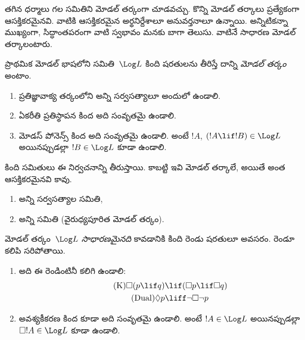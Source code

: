 \documentclass[../../../include/open-logic-section]{subfiles}
\begin{document}


తగిన ధర్మాలు గల  సమితిని మోడల్ తర్కంగా చూడవచ్చు. కొన్ని మోడల్ తర్కాలు ప్రత్యేకంగా ఆసక్తికరమైనవి. వాటికి ఆసక్తికరమైన అర్థనిర్దేశాలూ అనువర్తనాలూ ఉన్నాయి. అన్నిటికన్నా ముఖ్యంగా, సిద్ధాంతపరంగా వాటి స్వభావం మనకు బాగా తెలుసు. వాటినే సాధారణ మోడల్ తర్కాలంటారు.

\begin{defn}
ప్రాథమిక మోడల్ భాషలోని  సమితి~$\Log L$ కింది షరతులను తీరిస్తే దాన్ని \emph{మోడల్ తర్కం} అంటాం.
\begin{enumerate}
\item ప్రతిజ్ఞావాక్య తర్కంలోని అన్ని సర్వసత్యాలూ అందులో ఉండాలి.
\item ఏకరీతి ప్రతిస్థాపన కింద అది సంవృతమై ఉండాలి.
\item మోడస్ పోనెన్స్ కింద అది సంవృతమై ఉండాలి. అంటే $!A$, $(!A \lif
  !B) \in \Log L$ అయినప్పుడల్లా $!B \in \Log L$ కూడా ఉండాలి.
\end{enumerate}
\end{defn}

\begin{ex}
కింది  సమితులు ఈ నిర్వచనాన్ని తీరుస్తాయి. కాబట్టి ఇవి మోడల్ తర్కాలే, అయితే అంత ఆసక్తికరమైనవి కావు.
\begin{enumerate}
\item అన్ని సర్వసత్యాల సమితి,
\item అన్ని  సమితి (వైరుధ్యపూరిత మోడల్ తర్కం).
\end{enumerate}
\end{ex}

\begin{defn}\label{defn:normal-modal-logic}
మోడల్ తర్కం~$\Log L$ \emph{సాధారణమైనది} కావడానికి కింది రెండు షరతులూ అవసరం. రెండూ కలిపి సరిపోతాయి.
\begin{enumerate}
\item అది ఈ రెండింటినీ కలిగి ఉండాలి:
\begin{align}
\tag{K} \Box(p \lif q) & \lif (\Box p \lif \Box q) \\
\tag{Dual} \Diamond p & \liff \lnot \Box \lnot p
\end{align}
\item అవశ్యకీకరణ కింద కూడా అది సంవృతమై ఉండాలి. అంటే $!A \in
  \Log L$ అయినప్పుడల్లా $\Box !A \in \Log L$ కూడా ఉండాలి.
\end{enumerate}
\end{defn}
\end{document}
